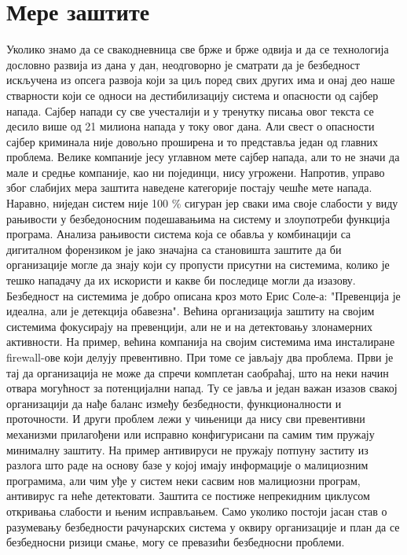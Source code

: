 \documentclass[a4paper]{article}
\begin{document}
	\section{Мере заштите}
	\label{sec:MereZastite}
	Уколико знамо да се свакодневница све брже и брже одвија и да се технологија дословно развија из дана у дан, неодговорно је сматрати да је безбедност искључена из опсега развоја који за циљ поред свих других има и онај део наше стварности који се односи на дестибилизацију система и опасности од сајбер напада\cite{semZastita}. Сајбер напади су све учесталији и у тренутку писања овог текста се десило више од 21 милиона напада у току овог дана\cite{brojNapada}. Али свест о опасности сајбер крими\-нала није довољно проширена и то представља један од главних пробле\-ма. Велике компаније јесу углавном мете сајбер напада, али то не значи да мале и средње компаније, као ни појединци, нису угрожени. Напротив, управо због слабијих мера заштита наведене категорије постају чешће мете напада. \newline
   	Наравно, ниједан систем није 100 \% сигуран јер сваки има своје слабо\-сти у виду рањивости у безбедоносним подешавањима на систему и
	злоупо\-треби функција програма. Анализа рањивости система која се обавља у комбинацији са дигиталном форензиком је јако значајна са
	станови\-шта заштите  да би организације могле да знају који су 
	пропусти присутни на системима, колико је тешко нападачу да их искористи и какве би последице могли да изазову. Безбедност на систе\-мима је добро описана кроз мото Ерис Соле-а: "Превенција је идеална, али је детекција обавезна"\cite{EricCole}. Већина организација заштиту на својим системима фокусира\-ју на превенцији, али не и на детектовању злона\-мерних активности. На пример, већина компанија на својим системима има инсталиране firewall-ове који делују превентивно. При томе се јављају два проблема. Први је тај да организација не може да спречи комплетан саобраћај, што на неки начин отвара могућност за потенци\-јални напад. Ту се јавља и један важан изазов свакој организацији да нађе баланс између безбедности, функционалности и проточности. И други проблем лежи у чињеници да нису сви превентивни механизми прилагођени или исправно конфигурисани па самим тим пружају мини\-малну заштиту. На пример антивируси не пружају потпуну заститу из разлога што раде на основу базе у којој имају информације о малициозним програми\-ма, али чим уђе у систем неки сасвим нов малициозни програм, антивирус га неће детектовати. Заштита се пости\-же непрекидним циклусом откривања слабости и њеним исправљањем. Само уколико постоји јасан став о разумевању безбедности рачунар\-ских система у оквиру организације и план да се безбедносни ризици смање, могу се превазићи безбедносни проблеми. 
\end{document}
